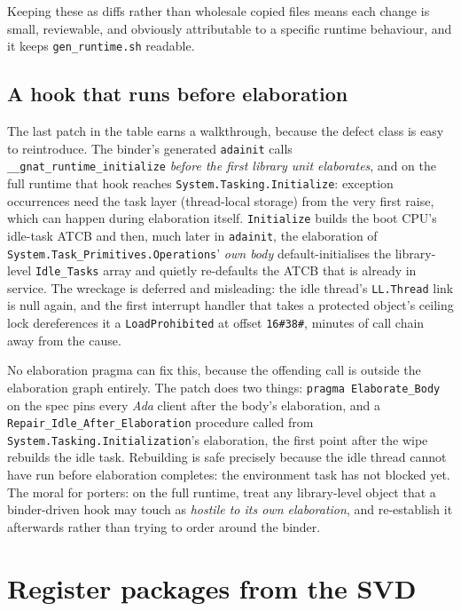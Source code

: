 Keeping these as diffs rather than wholesale copied files means each change is
small, reviewable, and obviously attributable to a specific runtime behaviour,
and it keeps \texttt{gen\_runtime.sh} readable.

\subsection{A hook that runs before elaboration}

The last patch in the table earns a walkthrough, because the defect class is
easy to reintroduce.  The binder's generated \texttt{adainit} calls
\texttt{\_\_gnat\_runtime\_initialize} \emph{before the first library unit
elaborates}, and on the full runtime that hook reaches
\texttt{System.Tasking.Initialize}: exception occurrences need the task layer
(thread-local storage) from the very first raise, which can happen during
elaboration itself.  \texttt{Initialize} builds the boot CPU's idle-task ATCB
\textemdash{} and then, much later in \texttt{adainit}, the elaboration of
\texttt{System.Task\_Primitives.Operations}' \emph{own body}
default-initialises the library-level \texttt{Idle\_Tasks} array and quietly
re-defaults the ATCB that is already in service.  The wreckage is deferred and
misleading: the idle thread's \texttt{LL.Thread} link is null again, and the
first interrupt handler that takes a protected object's ceiling lock
dereferences it \textemdash{} a \texttt{LoadProhibited} at offset
\texttt{16\#38\#}, minutes of call chain away from the cause.

No elaboration pragma can fix this, because the offending call is outside the
elaboration graph entirely.  The patch does two things:
\texttt{pragma Elaborate\_Body} on the spec pins every \emph{Ada} client
after the body's elaboration, and a \texttt{Repair\_Idle\_After\_Elaboration}
procedure \textemdash{} called from \texttt{System.Tasking.Initialization}'s
elaboration, the first point after the wipe \textemdash{} rebuilds the idle
task.  Rebuilding is safe precisely because the idle thread cannot have run
before elaboration completes: the environment task has not blocked yet.  The
moral for porters: on the full runtime, treat any library-level object that a
binder-driven hook may touch as \emph{hostile to its own elaboration}, and
re-establish it afterwards rather than trying to order around the binder.

\section{Register packages from the SVD}

